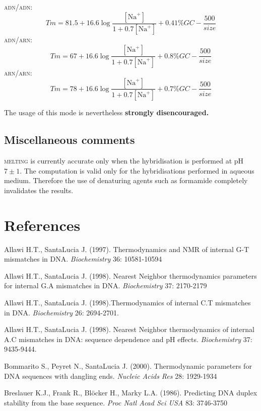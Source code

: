 \documentclass{article}
\begin{document}
\textsc{adn/adn}:
\begin{displaymath}
Tm = 81.5 + 16.6\log\frac{[\mbox{Na}^+]}{1+0.7[\mbox{Na}^+]} + 0.41\% GC - \frac{500}{size}
\end{displaymath}
\textsc{adn/arn}:
\begin{displaymath}
Tm = 67 + 16.6\log\frac{[\mbox{Na}^+]}{1+0.7[\mbox{Na}^+]} + 0.8\% GC - \frac{500}{size}
\end{displaymath}
\textsc{arn/arn}:
\begin{displaymath}
Tm = 78 + 16.6\log\frac{[\mbox{Na}^+]}{1+0.7[\mbox{Na}^+]} + 0.7\% GC - \frac{500}{size}
\end{displaymath}

  The usage of this mode is nevertheless  \textbf{strongly disencouraged.}   
   
\subsection{Miscellaneous comments }  
\textsc{melting} is currently accurate only when the hybridisation is performed
at pH $7\pm 1$.  The computation is valid only for the hybridisations performed
in aqueous medium. Therefore the use of denaturing agents such as formamide
completely invalidates the results.
   
\section{References }
Allawi 
H.T., SantaLucia J. (1997). Thermodynamics and NMR of internal G-T mismatches 
in DNA. \textit{Biochemistry}  36: 10581-10594   

Allawi H.T., SantaLucia J. (1998). Nearest Neighbor thermodynamics parameters 
for internal G.A mismatches in DNA. \textit{Biochemistry} 37: 2170-2179

Allawi H.T., SantaLucia J. (1998).Thermodynamics of internal C.T mismatches in DNA.
\textit{Biochemistry} 26: 2694-2701.

Allawi H.T., SantaLucia J. (1998). Nearest Neighbor thermodynamics of internal 
A.C mismatches in DNA: sequence dependence and pH effects.
\textit{Biochemistry} 37: 9435-9444.

Bommarito S., Peyret N., SantaLucia J. (2000).  Thermodynamic parameters for DNA
sequences with dangling ends.  \textit{Nucleic Acids Res} 28: 1929-1934

  Breslauer K.J., Frank R., Bl\"ocker 
H., Marky L.A. (1986). Predicting DNA duplex stability from the base sequence. 
 \textit{Proc Natl Acad Sci USA}  83: 3746-3750   
\end{document}
